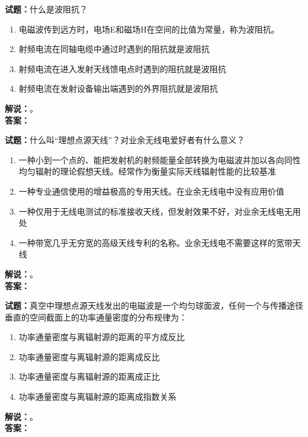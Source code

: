 \documentclass{ctexbook}
\begin{document}
\bigskip




\noindent\textbf{试题：}什么是波阻抗？
\begin{enumerate}[leftmargin=3em]
\item 电磁波传到远方时，电场E和磁场H在空间的比值为常量，称为波阻抗。
\item 射频电流在同轴电缆中通过时遇到的阻抗就是波阻抗
\item 射频电流在进入发射天线馈电点时遇到的阻抗就是波阻抗
\item 射频电流在发射设备输出端遇到的外界阻抗就是波阻抗
\end{enumerate}
\noindent\textbf{解说：}\textbf{}。\\\noindent\textbf{答案：}

\bigskip




\noindent\textbf{试题：}什么叫“理想点源天线”？对业余无线电爱好者有什么意义？
\begin{enumerate}[leftmargin=3em]
\item 一种小到一个点的、能把发射机的射频能量全部转换为电磁波并加以各向同性均匀辐射的理论假想天线。经常作为衡量实际天线辐射性能的比较基准
\item 一种专业通信使用的增益极高的专用天线。在业余无线电中没有应用价值
\item 一种仅用于无线电测试的标准接收天线，但发射效果不好，对业余无线电无用处
\item 一种带宽几乎无穷宽的高级天线专利的名称。业余无线电不需要这样的宽带天线
\end{enumerate}
\noindent\textbf{解说：}\textbf{}。\\\noindent\textbf{答案：}

\bigskip




\noindent\textbf{试题：}真空中理想点源天线发出的电磁波是一个均匀球面波，任何一个与传播途径垂直的空间截面上的功率通量密度的分布规律为：
\begin{enumerate}[leftmargin=3em]
\item 功率通量密度与离辐射源的距离的平方成反比
\item 功率通量密度与离辐射源的距离成反比
\item 功率通量密度与离辐射源的距离成正比
\item 功率通量密度与离辐射源的距离成指数关系
\end{enumerate}
\noindent\textbf{解说：}\textbf{}。\\\noindent\textbf{答案：}

\bigskip
\end{document}
